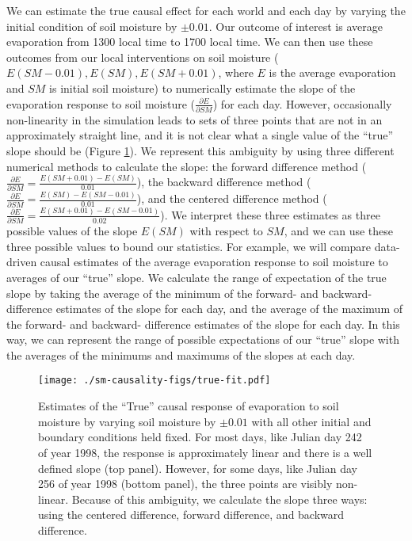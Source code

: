 \documentclass[12pt]{article}
\begin{document}
We can estimate the true causal effect for each world and each day by
varying the initial condition of soil moisture by $\pm0.01$. Our
outcome of interest is average evaporation from 1300 local time to
1700 local time. We can then use these outcomes from our local
interventions on soil moisture ($E(SM-0.01), E(SM), E(SM+0.01)$, where
$E$ is the average evaporation and $SM$ is initial soil moisture) to
numerically estimate the slope of the evaporation response to soil
moisture ($\frac{\partial E}{\partial SM}$) for each day. However,
occasionally non-linearity in the simulation leads to sets of three
points that are not in an approximately straight line, and it is not
clear what a single value of the ``true'' slope should be (Figure
\ref{fig:true-fit}). We represent this ambiguity by using three
different numerical methods to calculate the slope: the forward
difference method ($\frac{\partial E}{\partial SM} = \frac{E(SM+0.01)
  - E(SM)}{0.01}$), the backward difference method ($\frac{\partial
  E}{\partial SM} = \frac{E(SM) - E(SM-0.01)}{0.01}$), and the
centered difference method ($\frac{\partial E}{\partial SM} =
\frac{E(SM+0.01) - E(SM-0.01)}{0.02}$). We interpret these three
estimates as three possible values of the slope $E(SM)$ with respect
to $SM$, and we can use these three possible values to bound our
statistics. For example, we will compare data-driven causal estimates
of the average evaporation response to soil moisture to averages of
our ``true'' slope. We calculate the range of expectation of the true
slope by taking the average of the minimum of the forward- and
backward- difference estimates of the slope for each day, and the
average of the maximum of the forward- and backward- difference
estimates of the slope for each day. In this way, we can represent the
range of possible expectations of our ``true'' slope with the averages
of the minimums and maximums of the slopes at each day.

\begin{figure}
  \texttt{[image: ./sm-causality-figs/true-fit.pdf]}
  \caption{Estimates of the ``True'' causal response of evaporation to
    soil moisture by varying soil moisture by $\pm0.01$ with all other
    initial and boundary conditions held fixed. For most days, like
    Julian day 242 of year 1998, the response is approximately linear
    and there is a well defined slope (top panel). However, for some
    days, like Julian day 256 of year 1998 (bottom panel), the three
    points are visibly non-linear. Because of this ambiguity, we
    calculate the slope three ways: using the centered difference,
    forward difference, and backward difference.}\label{fig:true-fit}
\end{figure}
\end{document}

